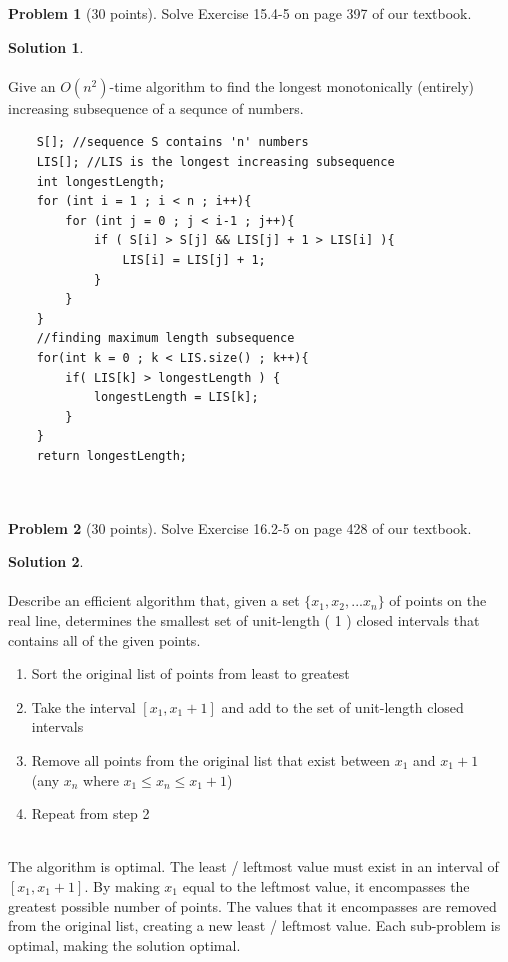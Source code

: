 \documentclass{article}
\theoremstyle{definition}
\newtheorem{problem}{Problem}
\newtheorem*{solution}{Solution}
\begin{document}
\begin{problem}[30 points]
Solve Exercise 15.4-5 on page 397 of our textbook. 
\end{problem}
\begin{solution} \\
\\
Give an $O(n^2)$-time algorithm to find the longest monotonically (entirely) increasing subsequence of a sequnce of numbers.
\\
\begin{verbatim}
    S[]; //sequence S contains 'n' numbers
    LIS[]; //LIS is the longest increasing subsequence
    int longestLength;
    for (int i = 1 ; i < n ; i++){
        for (int j = 0 ; j < i-1 ; j++){
            if ( S[i] > S[j] && LIS[j] + 1 > LIS[i] ){
                LIS[i] = LIS[j] + 1;
            }
        }
    }
    //finding maximum length subsequence
    for(int k = 0 ; k < LIS.size() ; k++){
        if( LIS[k] > longestLength ) {
            longestLength = LIS[k];
        }
    }
    return longestLength;
    
    
\end{verbatim}
\end{solution}

\begin{problem}[30 points]
Solve Exercise 16.2-5 on page 428 of our textbook. 
\end{problem}
\begin{solution} \\
\\
Describe an efficient algorithm that, given a set $\{x_1,x_2,...x_n\}$ of points on the real line, determines the smallest set of unit-length ( 1 ) closed intervals that contains all of the given points.
\begin{enumerate}
    \item Sort the original list of points from least to greatest
    \item Take the interval $[x_1 , x_1 + 1]$ and add to the set of unit-length closed intervals
    \item Remove all points from the original list that exist between $x_1$ and $x_1 + 1$\\
    (any $x_n$ where $x_1 \leq x_n \leq x_1 + 1$)
    \item Repeat from step 2
\end{enumerate}
\\
The algorithm is optimal. The least / leftmost value must exist in an interval of $[x_1 , x_1 + 1]$. By making $x_1$ equal to the leftmost value, it encompasses the greatest possible number of points. The values that it encompasses are removed from the original list, creating a new least / leftmost value. Each sub-problem is optimal, making the solution optimal.
\end{solution}

\medskip



\goodbreak
\checklist
\end{document}
